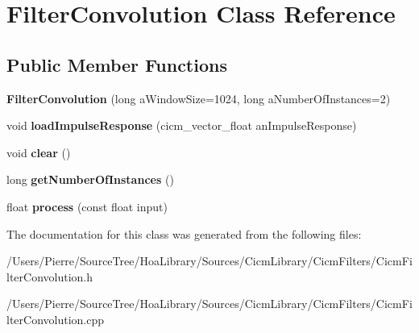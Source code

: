 \hypertarget{class_filter_convolution}{\section{Filter\-Convolution Class Reference}
\label{class_filter_convolution}
}
\subsection*{Public Member Functions}
\begin{DoxyCompactItemize}
\item 
\hypertarget{class_filter_convolution_a99521d63b9804c304e61f5be9378b3bf}{{\bfseries Filter\-Convolution} (long a\-Window\-Size=1024, long a\-Number\-Of\-Instances=2)}\label{class_filter_convolution_a99521d63b9804c304e61f5be9378b3bf}

\item 
\hypertarget{class_filter_convolution_a9db8f05caa24a09767a6b3d69c7dda31}{void {\bfseries load\-Impulse\-Response} (cicm\-\_\-vector\-\_\-float an\-Impulse\-Response)}\label{class_filter_convolution_a9db8f05caa24a09767a6b3d69c7dda31}

\item 
\hypertarget{class_filter_convolution_acf2ce723d42a855a21c4397de82fb23f}{void {\bfseries clear} ()}\label{class_filter_convolution_acf2ce723d42a855a21c4397de82fb23f}

\item 
\hypertarget{class_filter_convolution_ab7ad079059769d24d3c085b438490346}{long {\bfseries get\-Number\-Of\-Instances} ()}\label{class_filter_convolution_ab7ad079059769d24d3c085b438490346}

\item 
\hypertarget{class_filter_convolution_abe951088f8edacfbd34bd97370f99ef3}{float {\bfseries process} (const float input)}\label{class_filter_convolution_abe951088f8edacfbd34bd97370f99ef3}

\end{DoxyCompactItemize}


The documentation for this class was generated from the following files\-:\begin{DoxyCompactItemize}
\item 
/\-Users/\-Pierre/\-Source\-Tree/\-Hoa\-Library/\-Sources/\-Cicm\-Library/\-Cicm\-Filters/Cicm\-Filter\-Convolution.\-h\item 
/\-Users/\-Pierre/\-Source\-Tree/\-Hoa\-Library/\-Sources/\-Cicm\-Library/\-Cicm\-Filters/Cicm\-Filter\-Convolution.\-cpp\end{DoxyCompactItemize}
